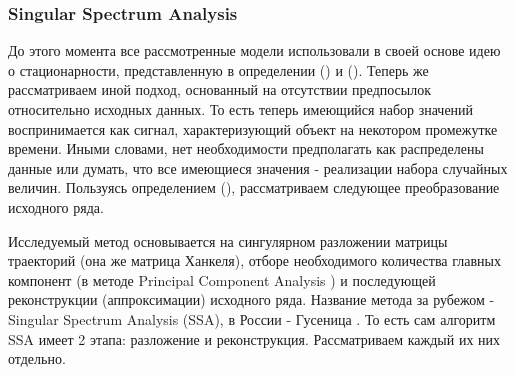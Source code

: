 \subsubsection{Singular Spectrum Analysis} \label{link::ssa}
До этого момента все рассмотренные модели использовали в своей основе идею о стационарности, представленную в определении () и (). Теперь же рассматриваем иной подход, основанный на отсутствии предпосылок относительно исходных данных. То есть теперь имеющийся набор значений воспринимается как сигнал, характеризующий объект на некотором промежутке времени. Иными словами, нет необходимости предполагать как распределены данные или думать, что все имеющиеся значения - реализации набора случайных величин. Пользуясь определением (), рассматриваем следующее преобразование исходного ряда.

Исследуемый метод основывается на сингулярном разложении матрицы траекторий (она же матрица Ханкеля), отборе необходимого количества главных компонент (в методе Principal Component Analysis \cite{abdi2010pca}) и последующей реконструкции (аппроксимации) исходного ряда. Название метода за рубежом - Singular Spectrum Analysis (SSA), в России - Гусеница \cite{catarpillar_ssa}. То есть сам алгоритм SSA имеет 2 этапа: разложение и реконструкция. Рассматриваем каждый их них отдельно.


